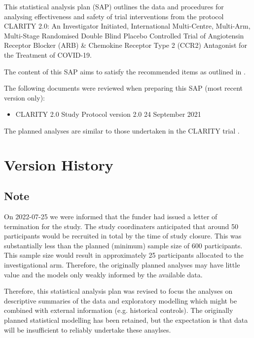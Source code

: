 \documentclass[11pt,parskip=half-]{scrartcl}
\begin{document}
This statistical analysis plan (SAP) outlines the data and procedures for analysing effectiveness and safety of trial interventions from the protocol CLARITY 2.0: An Investigator Initiated, International Multi-Centre, Multi-Arm, Multi-Stage Randomised Double Blind Placebo Controlled Trial of Angiotensin Receptor Blocker (ARB) \& Chemokine Receptor Type 2 (CCR2) Antagonist for the Treatment of COVID-19.

The content of this SAP aims to satisfy the recommended items as outlined in \cite{gamble2017}.

The following documents were reviewed when preparing this SAP (most recent version only):

\begin{itemize}
    \item CLARITY 2.0 Study Protocol version 2.0 24 September 2021
\end{itemize}


The planned analyses are similar to those undertaken in the CLARITY trial \cite{hockham2021protocol, mcgree2021controlled}.

\section*{Version History}

\subsection*{Note}

On 2022-07-25 we were informed that the funder had issued a letter of termination for the study. The study coordinaters anticipated that around 50 participants would be recruited in total by the time of study closure. This was substantially less than the planned (minimum) sample size of 600 participants. This sample size would result in approximately 25 participants allocated to the investigational arm. Therefore, the originally planned analyses may have little value and the models only weakly informed by the available data.

Therefore, this statistical analysis plan was revised to focus the analyses on descriptive summaries of the data and exploratory modelling which might be combined with external information (e.g. historical controls). The originally planned statistical modelling has been retained, but the expectation is that data will be insufficient to reliably undertake these anaylses.
\end{document}
